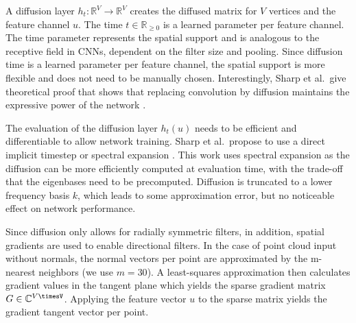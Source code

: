 \documentclass[class=article, crop=false]{standalone}
\begin{document}
A diffusion layer $h_t : \mathbb{R}^V \to \mathbb{R}^V$ creates the diffused matrix for $V$ vertices and the feature channel $u$. The time $t \in \mathbb{R}_{\geq 0}$ is a learned parameter per feature channel. The time parameter represents the spatial support and is analogous to the receptive field in CNNs, dependent on the filter size and pooling. Since diffusion time is a learned parameter per feature channel, the spatial support is more flexible and does not need to be manually chosen. Interestingly, Sharp et al.\ give theoretical proof that shows that replacing convolution by diffusion maintains the expressive power of the network \cite[Appendix A]{sharp2022diffusion}.

The evaluation of the diffusion layer $h_t(u)$ needs to be efficient and differentiable to allow network training. Sharp et al.\ propose to use a direct implicit timestep or spectral expansion \cite[Section 3.3]{sharp2022diffusion}. This work uses spectral expansion as the diffusion can be more efficiently computed at evaluation time, with the trade-off that the eigenbases need to be precomputed. Diffusion is truncated to a lower frequency basis $k$, which leads to some approximation error, but no noticeable effect on network performance.

Since diffusion only allows for radially symmetric filters, in addition, spatial gradients are used to enable directional filters. In the case of point cloud input without normals, the normal vectors per point are approximated by the m-nearest neighbors (we use $m = 30$). A least-squares approximation then calculates gradient values in the tangent plane which yields the sparse gradient matrix $G \in \mathbb{C}^{V\timesV}$. Applying the feature vector $u$ to the sparse matrix yields the gradient tangent vector per point.



\end{document}
